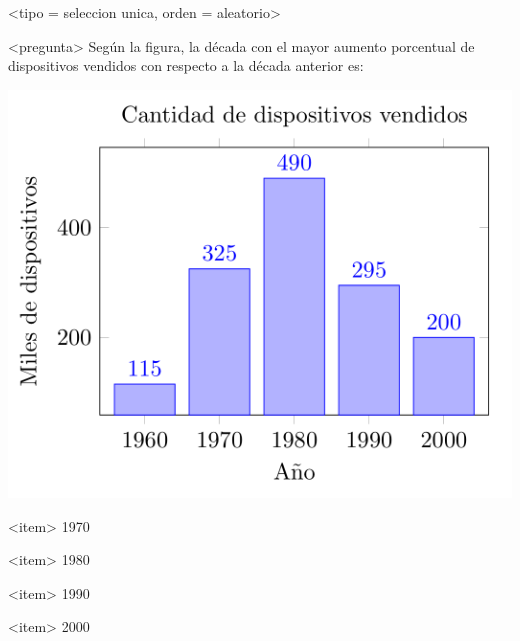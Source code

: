 <tipo = seleccion unica, orden = aleatorio>

<pregunta>
Según la figura, la década con el mayor aumento porcentual de dispositivos vendidos con respecto a la década anterior es:
\begin{center}
  \includegraphics[scale=0.5]{../vendidos.png}
\end{center}

<item>
1970

<item>
1980

<item>
1990

<item>
2000

